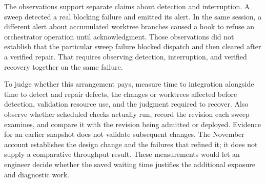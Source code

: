 The observations support separate claims about detection and interruption. A sweep detected a real blocking failure and emitted its alert. In the same session, a different alert about accumulated worktree branches caused a hook to refuse an orchestrator operation until acknowledgment. Those observations did not establish that the particular sweep failure blocked dispatch and then cleared after a verified repair. That requires observing detection, interruption, and verified recovery together on the same failure.

To judge whether this arrangement pays, measure time to integration alongside time to detect and repair defects, the changes or worktrees affected before detection, validation resource use, and the judgment required to recover. Also observe whether scheduled checks actually run, record the revision each sweep examines, and compare it with the revision being admitted or deployed. Evidence for an earlier snapshot does not validate subsequent changes. The November account establishes the design change and the failures that refined it; it does not supply a comparative throughput result. These measurements would let an engineer decide whether the saved waiting time justifies the additional exposure and diagnostic work.
